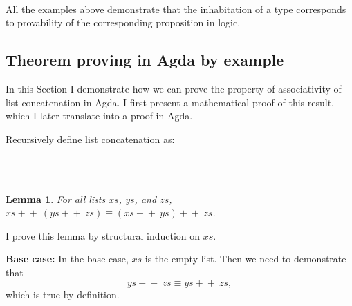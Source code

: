 \documentclass[12pt,a4paper,twoside,openright]{report}
\newtheorem{lemma}{Lemma}[section]
\begin{document}
\begin{code}
\> \AgdaSymbol{:} \AgdaSymbol{\{}  \AgdaSymbol{:} \AgdaSymbol{\}}    \AgdaSymbol{(}  \AgdaSymbol{)}  \<%
\\
\>   \AgdaSymbol{=}  \<%
\end{code}

All the examples above demonstrate that the inhabitation of a type corresponds to provability of the corresponding proposition in logic.

\subsection{Theorem proving in Agda by example} \label{proving}

In this Section I demonstrate how we can prove the property of associativity of list concatenation in Agda. I first present a mathematical proof of this result, which I later translate into a proof in Agda.

Recursively define list concatenation as:

\begin{code}
\>\AgdaFunction{\_++\_} \AgdaSymbol{:} \AgdaSymbol{\{} \AgdaSymbol{:} \AgdaSymbol{\}}         \<%
\\
\>\AgdaInductiveConstructor{[]} \AgdaFunction{++}  \AgdaSymbol{=} \<%
\\
\>\AgdaSymbol{(}  \AgdaSymbol{)} \AgdaFunction{++}  \AgdaSymbol{=}   \AgdaSymbol{(} \AgdaFunction{++} \AgdaSymbol{)}\<%
\end{code}

\begin{lemma}
For all lists $xs$, $ys$, and $zs$, $xs +\!\!+\ (ys +\!\!+\ zs) \equiv (xs +\!\!+\ ys) +\!\!+\ zs$.
\end{lemma}

I prove this lemma by structural induction on $xs$.

{\bf Base case:} In the base case, $xs$ is the empty list. Then we need to demonstrate that $$ys +\!\!+\ zs \equiv ys +\!\!+\ zs,$$ which is true by definition.
\end{document}
